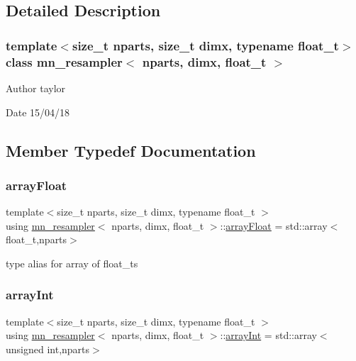 \subsection{Detailed Description}
\subsubsection*{template$<$size\+\_\+t nparts, size\+\_\+t dimx, typename float\+\_\+t$>$\newline
class mn\+\_\+resampler$<$ nparts, dimx, float\+\_\+t $>$}

\begin{DoxyAuthor}{Author}
taylor 
\end{DoxyAuthor}
\begin{DoxyDate}{Date}
15/04/18 
\end{DoxyDate}


\subsection{Member Typedef Documentation}
\mbox{\label{classmn__resampler_ae26be2889cf3cd4ddea66928d879809e}} 
\subsubsection{\texorpdfstring{array\+Float}{arrayFloat}}
{\footnotesize\ttfamily template$<$size\+\_\+t nparts, size\+\_\+t dimx, typename float\+\_\+t $>$ \\
using \hyperlink{classmn__resampler}{mn\+\_\+resampler}$<$ nparts, dimx, float\+\_\+t $>$\+::\hyperlink{classrbase_a6f76bef853e508cb5b6f546d231b06f5}{array\+Float} =  std\+::array$<$float\+\_\+t,nparts$>$}

type alias for array of float\+\_\+ts \mbox{\label{classmn__resampler_afb5d000e2464afef813792c57c42599b}} 
\subsubsection{\texorpdfstring{array\+Int}{arrayInt}}
{\footnotesize\ttfamily template$<$size\+\_\+t nparts, size\+\_\+t dimx, typename float\+\_\+t $>$ \\
using \hyperlink{classmn__resampler}{mn\+\_\+resampler}$<$ nparts, dimx, float\+\_\+t $>$\+::\hyperlink{classmn__resampler_afb5d000e2464afef813792c57c42599b}{array\+Int} =  std\+::array$<$unsigned int,nparts$>$}

